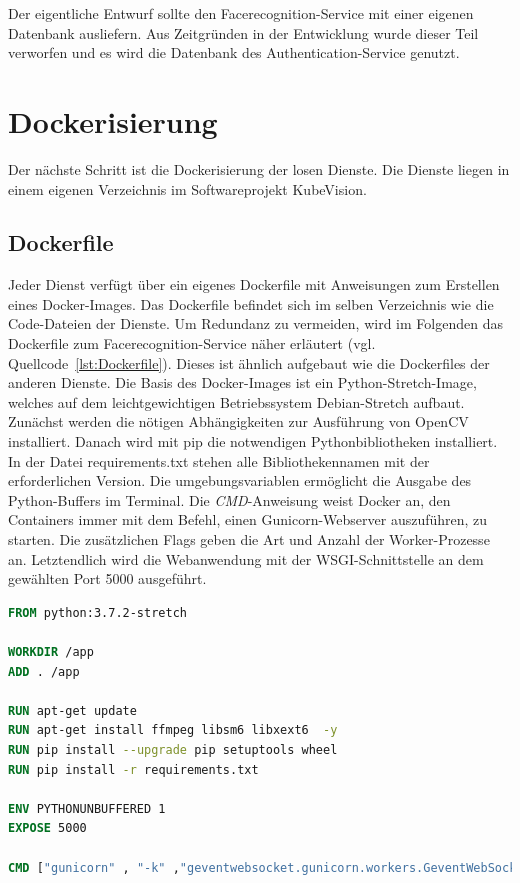 Der eigentliche Entwurf sollte den Facerecognition-Service mit einer eigenen Datenbank ausliefern.
Aus Zeitgründen in der Entwicklung wurde dieser Teil verworfen und es wird die Datenbank des Authentication-Service genutzt.


\section{Dockerisierung}

Der nächste Schritt ist die Dockerisierung der losen Dienste.
Die Dienste liegen in einem eigenen Verzeichnis im Softwareprojekt KubeVision.

\subsection{Dockerfile}

Jeder Dienst verfügt über ein eigenes Dockerfile mit Anweisungen zum Erstellen eines Docker-Images.
Das Dockerfile befindet sich im selben Verzeichnis wie die Code-Dateien der Dienste.
Um Redundanz zu vermeiden, wird im Folgenden das Dockerfile zum Facerecognition-Service näher erläutert (vgl. Quellcode~\ref{lst:Dockerfile}).
Dieses ist ähnlich aufgebaut wie die Dockerfiles der anderen Dienste.
Die Basis des Docker-Images ist ein Python-Stretch-Image, welches auf dem leichtgewichtigen Betriebssystem Debian-Stretch aufbaut.
Zunächst werden die nötigen Abhängigkeiten zur Ausführung von OpenCV installiert.
Danach wird mit pip die notwendigen Pythonbibliotheken installiert.
In der Datei requirements.txt stehen alle Bibliothekennamen mit der erforderlichen Version.
Die umgebungsvariablen ermöglicht die Ausgabe des Python-Buffers im Terminal.
Die \textit{CMD}-Anweisung weist Docker an, den Containers immer mit dem Befehl, einen Gunicorn-Webserver auszuführen, zu starten.
Die zusätzlichen Flags geben die Art und Anzahl der Worker-Prozesse an.
Letztendlich wird die Webanwendung mit der WSGI-Schnittstelle an dem gewählten Port 5000 ausgeführt.

\begin{lstlisting}[caption={Dockerfile},captionpos=b ,label={lst:Dockerfile},language=Dockerfile]
FROM python:3.7.2-stretch

WORKDIR /app
ADD . /app

RUN apt-get update
RUN apt-get install ffmpeg libsm6 libxext6  -y
RUN pip install --upgrade pip setuptools wheel
RUN pip install -r requirements.txt

ENV PYTHONUNBUFFERED 1
EXPOSE 5000

CMD ["gunicorn" , "-k" ,"geventwebsocket.gunicorn.workers.GeventWebSocketWorker", "-w", "3" , "--bind" , ":5000" , "run:app"]
\end{lstlisting}


